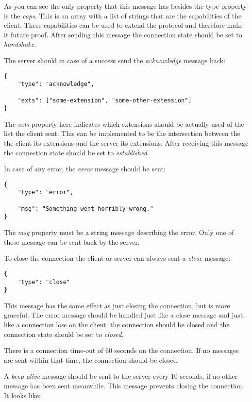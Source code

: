 \documentclass[11pt,a4paper]{article}
\begin{document}
As you can see the only property that this message has besides the type property is the \textit{caps}.
This is an array with a list of strings that are the capabilities of the client.
These capabilities can be used to extend the protocol and therefore make it future proof.
After sending this message the connection state should be set to \textit{handshake}.

The server should in case of a success send the \textit{acknowledge} message back:

\begin{verbatim}
{
    "type": "acknowledge",

    "exts": ["some-extension", "some-other-extension"]
}
\end{verbatim}

The \textit{exts} property here indicates which extensions should be actually used of the list the client sent.
This can be implemented to be the intersection between the the client its extensions and the server its extensions.
After receiving this message the connection state should be set to \textit{established}.

In case of any error, the \textit{error} message should be sent:

\begin{verbatim}
{
    "type": "error",

    "msg": "Something went horribly wrong."
}
\end{verbatim}

The \textit{msg} property must be a string message describing the error.
Only one of these message can be sent back by the server.

To close the connection the client or server can always sent a \textit{close} message:

\begin{verbatim}
{
    "type": "close"
}
\end{verbatim}

This message has the same effect as just closing the connection, but is more graceful.
The error message should be handled just like a close message and just like a connection loss on the client: the connection should be closed and the connection state should be set to \textit{closed}.

There is a connection time-out of 60 seconds on the connection.
If no messages are sent within that time, the connection should be closed.

A \textit{keep-alive} message should be sent to the server every 10 seconds, if no other message has been sent meanwhile.
This message prevents closing the connection. It looks like:
\end{document}
